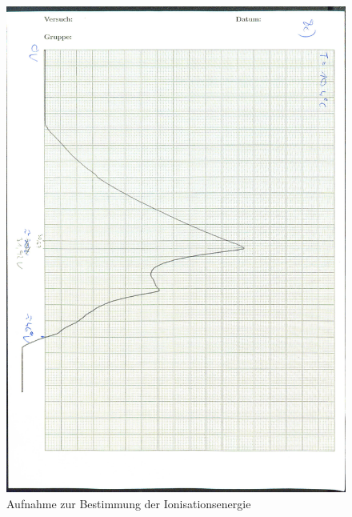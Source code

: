 \begin{figure}[H]
  \centering
  \includegraphics[width=\textwidth]{content/Ionspannung_0001.jpg}
  \caption{Aufnahme zur Bestimmung der Ionisationsenergie}
  \label{Bild:4}
\end{figure}
